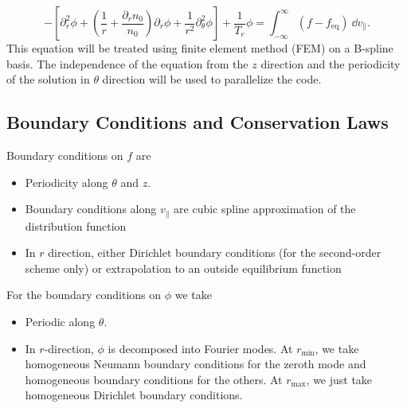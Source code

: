 \begin{equation}
- \left[\partial_r^2 \phi + \left( \frac{1}{r} + \frac{\partial_r n_0}{n_0}\right)\partial_r \phi + \frac{1}{r^2} \partial_\theta^2 \phi \right] + \frac{1}{T_e} \phi = \int_{-\infty}^{\infty} (f - f_\text{eq}) \ \dd v_\parallel. \label{eq:qn}
\end{equation}
This equation will be treated using finite element method (FEM) on a B-spline basis. The independence of the equation from the $z$ direction and the periodicity of the solution in $\theta$ direction will be used to parallelize the code.

\subsection{Boundary Conditions and Conservation Laws}

Boundary conditions on $f$ are
\begin{itemize}
    \item Periodicity along $\theta$ and $z$.
    \item Boundary conditions along $v_\parallel$ are cubic spline approximation of the distribution function %
    \item In $r$ direction, either Dirichlet boundary conditions (for the second-order scheme only) or extrapolation to an outside equilibrium function
\end{itemize}

For the boundary conditions on $\phi$ we take
\begin{itemize}
    \item Periodic along $\theta$.
    \item In $r$-direction, $\phi$ is decomposed into Fourier modes. At $r_\text{min}$, we take homogeneous Neumann boundary conditions for the zeroth mode and homogeneous boundary conditions for the others. At $r_\text{max}$, we just take homogeneous Dirichlet boundary conditions.
\end{itemize}




